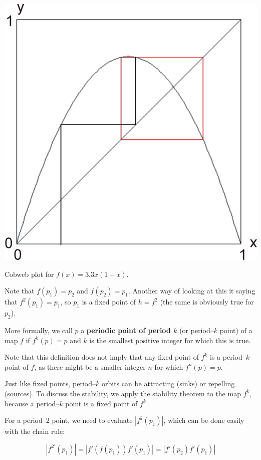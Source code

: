 \begin{marginfigure}
\centering
\includegraphics{dynamic/figures/cobweb2}
\caption{Cobweb plot for $f(x)=3.3x(1-x)$.}
\label{fig-cobweb2}
\end{marginfigure} 

Note that $f(p_1)=p_2$ and $f(p_2)=p_1$. Another way of looking at this it saying that $f^2(p_1)=p_1$, so $p_1$ is a fixed point of $h=f^2$ (the same is obviously true for $p_2$).

More formally, we call $p$ a \textbf{periodic point of period $k$} (or period--$k$ point) of a map $f$ if $f^k(p)=p$ and $k$ is the smallest positive integer for which this is true.

Note that this definition does not imply that any fixed point of $f^k$ is a period--$k$ point of $f$, as there might be a smaller integer $n$ for which $f^n(p)=p$.

Just like fixed points, period--$k$ orbits can be attracting (sinks) or repelling (sources). To discuss the stability, we apply the stability theorem to the map $f^k$, because a period--$k$ point is a fixed point of $f^k$.

For a period--2 point, we need to evaluate $|f^2(p_1)|$, which can be done easily with the chain rule:

\begin{equation}
|f^{2'}(p_1)| = |f'(f(p_1)) f'(p_1)| = |f'(p_2) f'(p_1)|
\end{equation}  


